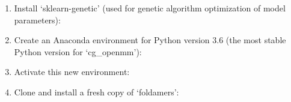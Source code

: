 \documentclass[letterpaper,12pt,english,openany,oneside]{sphinxmanual}
\begin{document}
\begin{enumerate}
\def\theenumi{\arabic{enumi}}
\def\labelenumi{\theenumi )}
\makeatletter\def\p@enumii{\p@enumi \theenumi )}\makeatother
\item {} 
Install ‘sklearn-genetic’ (used for genetic algorithm optimization of model parameters):

\begin{sphinxVerbatim}[commandchars=\\\{\}]
  
\end{sphinxVerbatim}

\item {} 
Create an Anaconda environment for Python version 3.6 (the most stable Python version for ‘cg\_openmm’):

\begin{sphinxVerbatim}[commandchars=\\\{\}]
          
\end{sphinxVerbatim}

\item {} 
Activate this new environment:

\begin{sphinxVerbatim}[commandchars=\\\{\}]
  
\end{sphinxVerbatim}

\item {} 
Clone and install a fresh copy of ‘foldamers’:

\begin{sphinxVerbatim}[commandchars=\\\{\}]
  
 
  
\end{sphinxVerbatim}


\end{enumerate}
\end{document}
